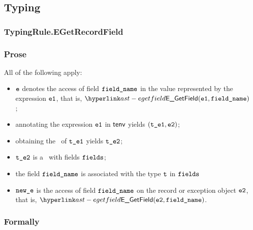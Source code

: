 \subsection{Typing}
\subsubsection{TypingRule.EGetRecordField \label{sec:TypingRule.EGetRecordField}}
\subsubsection{Prose}
All of the following apply:
\begin{itemize}
  \item $\ve$ denotes the access of field $\fieldname$ in the value represented by the expression $\veone$, that is, $\EGetField(\veone, \fieldname)$;
  \item annotating the expression $\veone$ in $\tenv$ yields $(\vteone, \vetwo)$\ProseOrTypeError;
  \item obtaining the \underlyingtype\ of $\vteone$ yields $\vtetwo$\ProseOrTypeError;
  \item $\vtetwo$ is a \structuredtype\ with fields $\fields$;
  \item the field $\fieldname$ is associated with the type $\vt$ in $\fields$
  \item $\newe$ is the access of field $\fieldname$ on the record or exception object $\vetwo$, that is, $\EGetField(\vetwo, \fieldname)$.
\end{itemize}
\subsubsection{Formally}
\begin{mathpar}
\end{mathpar}


